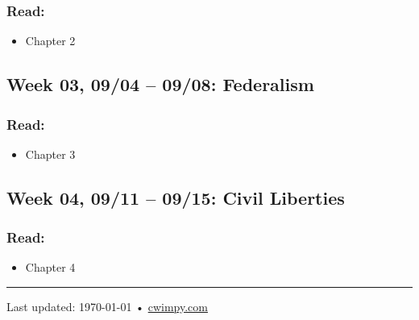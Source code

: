 \documentclass[11pt,]{article}
\providecommand{\tightlist}{%
  \setlength{\itemsep}{0pt}\setlength{\parskip}{0pt}}
\newcommand{\HRule}{\rule{\linewidth}{0.5mm}}
\begin{document}
\hypertarget{read-1}{%
\subsubsection{Read:}\label{read-1}}

\begin{itemize}
\tightlist
\item
  Chapter 2
\end{itemize}

\hypertarget{week-03-0904-0908-federalism}{%
\subsection{Week 03, 09/04 -- 09/08:
Federalism}\label{week-03-0904-0908-federalism}}

\hypertarget{read-2}{%
\subsubsection{Read:}\label{read-2}}

\begin{itemize}
\tightlist
\item
  Chapter 3
\end{itemize}

\hypertarget{week-04-0911-0915-civil-liberties}{%
\subsection{Week 04, 09/11 -- 09/15: Civil
Liberties}\label{week-04-0911-0915-civil-liberties}}

\hypertarget{read-3}{%
\subsubsection{Read:}\label{read-3}}

\begin{itemize}
\tightlist
\item
  Chapter 4
\end{itemize}





\vfill{}
\vfill{}
\HRule
\begin{center}
	{\scriptsize  Last updated: \today\- •\- \href{https://cwimpy.com}{cwimpy.com}}
 \end{center}
\end{document}
